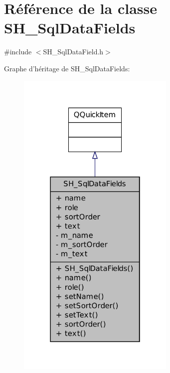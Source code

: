 \hypertarget{classSH__SqlDataFields}{\section{Référence de la classe S\-H\-\_\-\-Sql\-Data\-Fields}
\label{classSH__SqlDataFields}
}


{\ttfamily \#include $<$S\-H\-\_\-\-Sql\-Data\-Field.\-h$>$}



Graphe d'héritage de S\-H\-\_\-\-Sql\-Data\-Fields\-:
\nopagebreak
\begin{figure}[H]
\begin{center}
\leavevmode
\includegraphics[width=214pt]{classSH__SqlDataFields__inherit__graph}
\end{center}
\end{figure}


